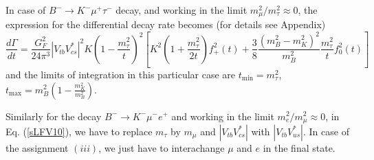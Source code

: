 \documentclass{ws-ijmpa}
\begin{document}
In case of $B^{-} \to K^{-}\mu^{+}\tau^{-}$ decay, and working in the limit $m^2_{\mu}/m^2_{\tau} \approx 0$, the expression for the differential decay rate becomes (for details see Appendix)
\begin{equation}
\frac{d\Gamma}{dt} = \frac{G_{F}^2}{24\pi^3}|V_{tb}V^{*}_{cs}|^2K\left(1-\frac{m_{\tau}^{2}}{t}\right)^2\left[K^2\left(1+\frac{m^2_{\tau}}{2t}\right)f^2_{+}(t)+\frac{3}{8}\frac{(m^2_{B}-m^2_{K})^2}{m^2_{B}}\frac{m^2_{\tau}}{t}f^2_{0}(t)\right]\label{sLFV10}
\end{equation}
and the limits of integration in this particular case are $t_{\text{min}} = m^2_{\tau}$, $t_{\text{max}} = m^2_{B}\left(1-\frac{m^2_{K}}{m^2_{B}}\right)$.

Similarly for the decay $B^{-} \to K^{-}\mu^{-}e^{+}$ and working in the limit $m^2_{e}/m^2_{\mu} \approx 0$, in Eq. (\ref{sLFV10}), we have to replace $m_{\tau}$ by $m_{\mu}$ and $|V_{tb}V^{*}_{cs}|$ with $|V_{tb}V^{*}_{us}|$. In case of the assignment $(iii)$, we just have to interachange $\mu$ and $e$ in the final state.
\end{document}
